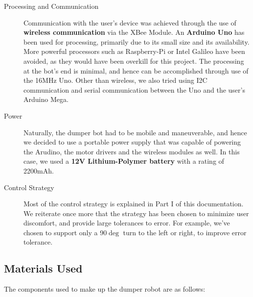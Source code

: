 \documentclass[a4paper]{article}
\begin{document}
\begin{description}
\item[Processing and Communication] Communication with the user's device was achieved through the use of \textbf{wireless communication} via the XBee Module. An \textbf{Arduino Uno} has been used for processing, primarily due to its small size and its availability. More powerful processors such as Raspberry-Pi or Intel Galileo have been avoided, as they would have been overkill for this project. The processing at the bot's end is minimal, and hence can be accomplished through use of the 16MHz Uno. Other than wireless, we also tried using I2C communication and serial communication between the Uno and the user's Arduino Mega.

\item[Power] Naturally, the dumper bot had to be mobile and maneuverable, and hence we decided to use a portable power supply that was capable of powering the Arudino, the motor drivers and the wireless modules as well. In this case, we used a \textbf{12V Lithium-Polymer battery} with a rating of 2200mAh. 

\item[Control Strategy] Most of the control strategy is explained in Part I of this documentation. We reiterate once more that the strategy has been chosen to minimize user discomfort, and provide large tolerances to error. For example, we've chosen to support only a 90$\deg$ turn to the left or right, to improve error tolerance.

\end{description}

\subsection{Materials Used}

The components used to make up the dumper robot are as follows:
\end{document}
